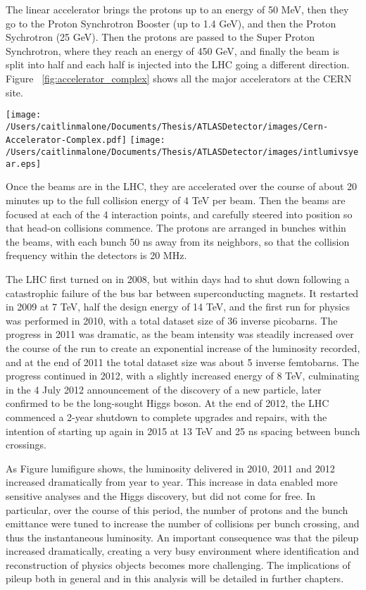 The linear accelerator brings the protons up to an energy of 50 MeV, then they go to the Proton Synchrotron Booster (up to 1.4 GeV), and then the Proton Sychrotron (25 GeV).  Then the protons are passed to the Super Proton Synchrotron, where they reach an energy of 450 GeV, and finally the beam is split into half and each half is injected into the LHC going a different direction.  Figure ~\ref{fig:accelerator_complex} shows all the major accelerators at the CERN site.

\texttt{[image: /Users/caitlinmalone/Documents/Thesis/ATLASDetector/images/Cern-Accelerator-Complex.pdf]}\label{fig:accelerator_complex}
\texttt{[image: /Users/caitlinmalone/Documents/Thesis/ATLASDetector/images/intlumivsyear.eps]}\label{fig:lumi_vs_year}


Once the beams are in the LHC, they are accelerated over the course of about 20 minutes up to the full collision energy of 4 TeV per beam.  Then the beams are focused at each of the 4 interaction points, and carefully steered into position so that head-on collisions commence.  The protons are arranged in bunches within the beams, with each bunch 50 ns away from its neighbors, so that the collision frequency within the detectors is 20 MHz.  

The LHC first turned on in 2008, but within days had to shut down following a catastrophic failure of the bus bar between superconducting magnets.  It restarted in 2009 at 7 TeV, half the design energy of 14 TeV, and the first run for physics was performed in 2010, with a total dataset size of 36 inverse picobarns.  The progress in 2011 was dramatic, as the beam intensity was steadily increased over the course of the run to create an exponential increase of the luminosity recorded, and at the end of 2011 the total dataset size was about 5 inverse femtobarns.  The progress continued in 2012, with a slightly increased energy of 8 TeV, culminating in the 4 July 2012 announcement of the discovery of a new particle, later confirmed to be the long-sought Higgs boson.  At the end of 2012, the LHC commenced a 2-year shutdown to complete upgrades and repairs, with the intention of starting up again in 2015 at 13 TeV and 25 ns spacing between bunch crossings.

As Figure lumifigure shows, the luminosity delivered in 2010, 2011 and 2012 increased dramatically from year to year.  This increase in data enabled more sensitive analyses and the Higgs discovery, but did not come for free.  In particular, over the course of this period, the number of protons and the bunch emittance were tuned to increase the number of collisions per bunch crossing, and thus the instantaneous luminosity.  An important consequence was that the pileup increased dramatically, creating a very busy environment where identification and reconstruction of physics objects becomes more challenging.  The implications of pileup both in general and in this analysis will be detailed in further chapters.


